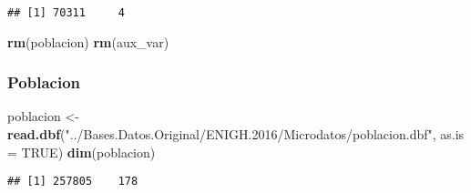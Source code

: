 \documentclass[11pt,]{article}
\newenvironment{Shaded}{\begin{snugshade}}{\end{snugshade}}
\newcommand{\KeywordTok}[1]{\textcolor[rgb]{0.13,0.29,0.53}{\textbf{#1}}}
\newcommand{\DataTypeTok}[1]{\textcolor[rgb]{0.13,0.29,0.53}{#1}}
\newcommand{\StringTok}[1]{\textcolor[rgb]{0.31,0.60,0.02}{#1}}
\newcommand{\OtherTok}[1]{\textcolor[rgb]{0.56,0.35,0.01}{#1}}
\newcommand{\NormalTok}[1]{#1}
\begin{document}
\begin{verbatim}
## [1] 70311     4
\end{verbatim}

\begin{Shaded}
\begin{Highlighting}[]
\KeywordTok{rm}\NormalTok{(poblacion)}
\KeywordTok{rm}\NormalTok{(aux_var)}
\end{Highlighting}
\end{Shaded}

\subsubsection{Poblacion}\label{poblacion}

\begin{Shaded}
\begin{Highlighting}[]
\NormalTok{poblacion <-}\StringTok{ }\KeywordTok{read.dbf}\NormalTok{(}\StringTok{"../Bases.Datos.Original/ENIGH.2016/Microdatos/poblacion.dbf"}\NormalTok{, }
                       \DataTypeTok{as.is =} \OtherTok{TRUE}\NormalTok{)}
\KeywordTok{dim}\NormalTok{(poblacion)}
\end{Highlighting}
\end{Shaded}

\begin{verbatim}
## [1] 257805    178
\end{verbatim}
\end{document}
